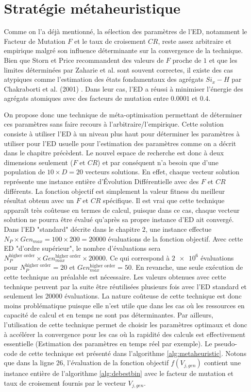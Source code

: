 \section{Stratégie métaheuristique}
Comme on l'a déjà mentionné, la sélection des paramètres de l'ED, notamment le Facteur de Mutation $F$ et le taux de croisement $CR$, reste assez arbitraire et empirique malgré son influence déterminante sur la convergence de la technique. Bien que Storn et Price \cite{Price2005} recommandent des valeurs de $F$ proche de $1$ et que les limites déterminées par Zaharie et al. \cite{Zaharie2002} sont souvent correctes, il existe des cas atypiques comme l'estimation des états fondamentaux des agrégats $Si_{x}-H$ par Chakraborti et al. (2001) \cite{Chakraborti2001}. Dans leur cas, l'ED a réussi à minimiser l'énergie des agrégats atomiques avec des facteurs de mutation entre $0.0001$ et $0.4$.

On propose donc une technique de méta-optimisation permettant de déterminer ces paramètres sans faire recours à l'arbitraire/l'empirique. Cette solution consiste à utiliser l'ED à un niveau plus haut pour déterminer les paramètres à utiliser pour l'ED usuelle pour l'estimation des paramètres comme on a décrit dans le chapitre précèdent. Le nouvel espace de recherche est donc à deux dimensions seulement ($F$ et $CR$) et par conséquent n'a besoin que d'une population de $10 \times D = 20$ vecteurs solutions. En effet, chaque vecteur solution représente une instance entière d'Évolution Différentielle avec des $F$ et $CR$ différents. La fonction objectif est simplement la valeur fitness du meilleur résultat obtenu avec un $F$ et $CR$ spécifique. Il est vrai que cette technique apparaît très coûteuse en termes de calcul, puisque dans ce cas, chaque vecteur solution ne pourra être évalué qu'après sa propre instance d'ED ait convergé. Dans l'ED "standard" décrite dans le chapitre 2, une instance effectue $N_P \times Gen_{max} = 100 \times 200 = 20000$ évaluations de la fonction objectif. Avec cette ED "d'ordre supérieur", le nombre d'évaluations sera $N_{P}^{\text{higher order}} \times Gen_{max}^{\text{higher order}} \times 20000$. Ce qui correspond à $\num{2e6}$ évaluations pour $N_{P}^{\text{higher order}} = 20$ et  $Gen_{max}^{\text{higher order}} = 50$. En revanche, une seule exécution de cette technique au préalable est nécessaire. Les valeurs obtenues avec cette technique peuvent par la suite être réutilisées plusieurs fois avec l'ED standard et seulement les 20000 évaluations. La nature coûteuse de cette technique est donc moins problématique puisque elle n'est utile que dans les cas où les ressources en capacité de calcul et en temps ne sont pas déterminantes. Par ailleurs, l'utilisation de cette technique permet de choisir les paramètres optimaux et donc à accélérer la convergence pour les cas où la rapidité des calculs est effectivement essentielle (Estimation des paramètres en temps réel par exemple). Le pseudo-code de cette technique est présenté dans l'algorithme \ref{alg:metaheuristic}. Notons que dans la ligne 26, l'évaluation de la fonction objectif $f(V_{j,gen})$ contient une instance entière de l'algorithme \ref{alg:debestbin} avec le facteur de mutation et taux de croisement fournis par le vecteur $V_{j,gen}$.\\

